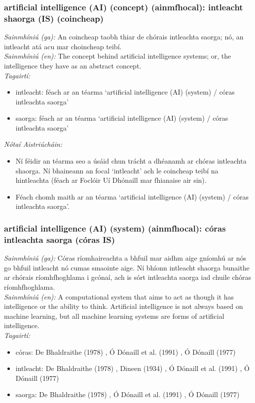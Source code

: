 \subsubsection*{artificial intelligence (AI) (concept) (ainmfhocal): intleacht shaorga (IS) (coincheap)}
 \noindent \textit{Sainmhíniú (ga):} An coincheap taobh thiar de chórais intleachta saorga; nó, an intleacht atá acu mar choincheap teibí.
\\
 \noindent \textit{Sainmhíniú (en):} The concept behind artificial intelligence systems; or, the intelligence they have as an abstract concept.
\\
 \noindent \textit{Tagairtí:}
\begin{itemize}
	\item intleacht: féach ar an téarma `artificial intelligence (AI) (system) / córas intleachta saorga'
	\item saorga: féach ar an téarma `artificial intelligence (AI) (system) / córas intleachta saorga'
\end{itemize}

 \noindent \textit{Nótaí Aistriúcháin:}
\begin{itemize}
	\item Ní féidir an téarma seo a úsáid chun trácht a dhéanamh ar chóras intleachta shaorga. Ní bhaineann an focal `intleacht' ach le coincheap teibí na hintleachta (féach ar Foclóir Uí Dhónaill mar fhianaise air sin).
	\item Féach chomh maith ar an téarma `artificial intelligence (AI) (system) / córas intleachta saorga'.
\end{itemize}


\subsubsection*{artificial intelligence (AI) (system) (ainmfhocal): córas intleachta saorga (córas IS)}
 \noindent \textit{Sainmhíniú (ga):} Córas ríomhaireachta a bhfuil mar aidhm aige gníomhú ar nós go bhfuil intleacht nó cumas smaointe aige. Ní bhíonn intleacht shaorga bunaithe ar chórais ríomhfhoghlama i gcónaí, ach is sórt intleachta saorga iad chuile chóras ríomhfhoghlama.
\\
 \noindent \textit{Sainmhíniú (en):} A computational system that aims to act as though it has intelligence or the ability to think. Artificial intelligence is not always based on machine learning, but all machine learning systems are forms of artificial intelligence.
\\
 \noindent \textit{Tagairtí:}
\begin{itemize}
	\item córas: De Bhaldraithe (1978) \cite{de-bhaldraithe}, Ó Dónaill et al. (1991) \cite{focloir-beag}, Ó Dónaill (1977) \cite{odonaill}
	\item intleacht: De Bhaldraithe (1978) \cite{de-bhaldraithe}, Dineen (1934) \cite{dineen}, Ó Dónaill et al. (1991) \cite{focloir-beag}, Ó Dónaill (1977) \cite{odonaill}
	\item saorga: De Bhaldraithe (1978) \cite{de-bhaldraithe}, Ó Dónaill et al. (1991) \cite{focloir-beag}, Ó Dónaill (1977) \cite{odonaill}
\end{itemize}


